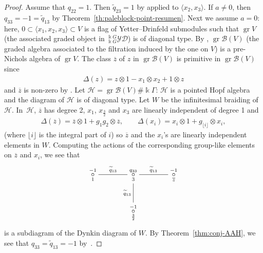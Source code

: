 \documentclass[pdftex]{sigma}
\numberwithin{equation}{section}
\newcommand{\gr}{\operatorname{gr}}
\newcommand{\toba}{\mathscr B}
\newcommand{\yd}[1]{{}_{#1}^{#1}\mathcal{YD}}
\newcommand{\tresdos}{\frac{3}{2}}
\begin{document}
\begin{proof}
Assume that $q_{22} = 1$.
Then $\widetilde{q}_{23} = 1$ by \cite[Lemma~2.3.7]{AAH-triang} applied to $\langle x_2, x_3\rangle$.
If $a\ne 0$, then $q_{33} = -1 = \widetilde{q}_{13}$ by Theorem~\ref{th:paleblock-point-resumen}.
Next we assume $a = 0$: here, $0 \subset \langle x_1, x_2, x_3\rangle \subset V$ is a flag of Yetter--Drinfeld submodules
such that $\gr V$ (the associated graded object in $\yd{\Bbbk G}$) is of diagonal type. By \cite[Lemma~3.4.2\,(b)]{AAH-triang},
$\gr \toba(V)$ (the graded algebra associated to the filtration induced by the one on $V$) is a pre-Nichols algebra of $\gr V$.
The class $\overline{z}$ of $z$ in $\gr \toba(V)$ is primitive in $\gr \toba(V)$ since
\begin{align*}
\Delta(z) =z\otimes 1 -x_1\otimes x_2 + 1\otimes z
\end{align*}
and $\overline{z}$ is non-zero by \cite[Propositions 8.1.6 and~8.1.7]{AAH-triang}. Let $\mathcal{H}=\gr \toba(V)\#\Bbbk\Gamma$: $\mathcal{H}$ is a pointed Hopf algebra and the diagram of $\mathcal{H}$ is of diagonal type. Let $W$ be the infinitesimal braiding of~$\mathcal{H}$. In~$\mathcal{H}$, $\overline{z}$ has degree 2, $x_1$, $x_{\tresdos}$ and $x_3$ are linearly independent of degree 1 and
\begin{align*}
\Delta(\overline{z}) =\overline{z}\otimes 1+g_1g_2 \otimes \overline{z},\qquad
\Delta(x_i)=x_i\otimes 1+g_{\lfloor i \rfloor}\otimes x_i,
\end{align*}
(where $\lfloor i\rfloor$ is the integral part of $i$) so $\overline{z}$ and the $x_i$'s are linearly independent elements in $W$.
Computing the actions of the corresponding group-like elements on $\overline{z}$ and $x_i$, we see that
$$
\xymatrix@C=40pt{\overset{-1}{\underset{1}{\circ}} \ar@{-}[r]^{\widetilde{q}_{13}} & \overset{q_{33}}{\underset{3}{\circ}} \ar@{-}[d]_{\widetilde{q}_{13}} \ar @{-}[r]^{\widetilde{q}_{13}} & \overset{-1}{\underset{\overline{z}}{\circ}}
\\ & \overset{-1}{\underset{\tresdos}{\circ}} &}
$$
is a subdiagram of the Dynkin diagram of $W$.
By Theorem~\ref{thm:conj-AAH}, we see that $q_{33}=\widetilde{q}_{13} =-1$ by~\cite{H-classif-RS}.


\end{proof}
\end{document}
